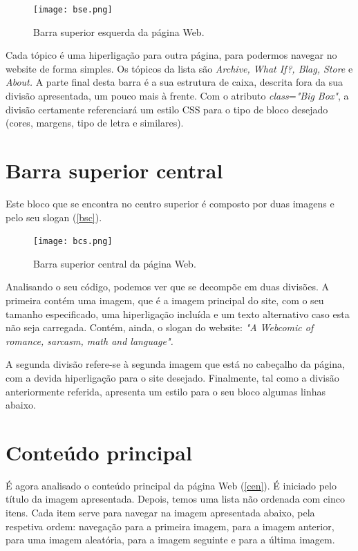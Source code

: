 \documentclass[11pt,openright,twoside]{report}
\begin{document}
\begin{figure}
 \center
 \texttt{[image: bse.png]}
 \caption{Barra superior esquerda da página Web.}
 \label{bse}
\end{figure}


Cada tópico é uma hiperligação para outra página, para podermos navegar no website de forma simples. Os tópicos da lista são \textit{Archive, What If?, Blag, Store} e \textit{About.} A parte final desta barra é a sua estrutura de caixa, descrita fora da sua divisão apresentada, um pouco mais à frente. Com o atributo \textit{class}=\textit{"Big Box"}, a divisão certamente referenciará um estilo CSS para o tipo de bloco desejado (cores, margens, tipo de letra e similares).


\section{Barra superior central}
Este bloco que se encontra no centro superior é composto por duas imagens e pelo seu slogan (\autoref{bsc}).
\smallskip 

\begin{figure}
 \center
 \texttt{[image: bcs.png]}
 \caption{Barra superior central da página Web.}
 \label{bsc}
\end{figure}


Analisando o seu código, podemos ver que se decompõe em duas divisões. A primeira contém uma imagem, que é a imagem principal do site, com o seu tamanho especificado, uma hiperligação incluída e um texto alternativo caso esta não seja carregada. Contém, ainda, o slogan do website: \textit{"A Webcomic of romance, sarcasm, math and language".}
\smallskip 

A segunda divisão refere-se à segunda imagem que está no cabeçalho da página, com a devida hiperligação para o site desejado. Finalmente, tal como a divisão anteriormente referida, apresenta um estilo para o seu bloco algumas linhas abaixo.


\section{Conteúdo principal}
É agora analisado o conteúdo principal da página Web (\autoref{cen}). É iniciado pelo título da imagem apresentada. Depois, temos uma lista não ordenada com cinco itens. Cada item serve para navegar na imagem apresentada abaixo, pela respetiva ordem: navegação para a primeira imagem, para a imagem anterior, para uma imagem aleatória, para a imagem seguinte e para a última imagem.
\smallskip
\end{document}
